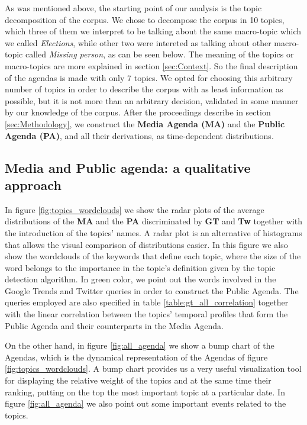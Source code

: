 
\par As was mentioned above, the starting point of our analysis is the topic decomposition of the corpus.
We chose to decompose the corpus in 10 topics, which three of them we interpret to be talking about the same macro-topic which we called \emph{Elections}, while other two were intereted as talking about other macro-topic called \emph{Missing person}, as can be seen below. 
The meaning of the topics or macro-topics are more explained in section \ref{sec:Context}. 
So the final description of the agendas is made with only 7 topics.
We opted for choosing this arbitrary number of topics in order to describe the corpus with as least information as possible, but it is not more than an arbitrary decision, validated in some manner by our knowledge of the corpus.
After the proceedings describe in section \ref{sec:Methodology}, we construct the \textbf{Media Agenda (MA)} and the \textbf{Public Agenda (PA)}, and all their derivations, as time-dependent distributions. 

\subsection{Media and Public agenda: a qualitative approach}

\par In figure \ref{fig:topics_wordclouds} we show the radar plots of the average distributions of the \textbf{MA} and the \textbf{PA} discriminated by \textbf{GT} and \textbf{Tw} together with the introduction of the topics' names.
A radar plot is an alternative of histograms that allows the visual comparison of distributions easier.
In this figure we also show the wordclouds of the keywords that define each topic, where the size of the word belongs to the importance in the topic's definition given by the topic detection algorithm. In green color, we point out the words involved in the Google Trends and Twitter queries in order to construct the Public Agenda. The queries employed are also specified in table \ref{table:gt_all_correlation} together with the linear correlation between the topics' temporal profiles that form the Public Agenda and their counterparts in the Media Agenda.

\par On the other hand, in figure \ref{fig:all_agenda} we show a bump chart of the Agendas, which is the dynamical representation of the Agendas of figure \ref{fig:topics_wordclouds}. 
A bump chart provides us a very useful visualization tool for displaying the relative weight of the topics and at the same time their ranking, putting on the top the most important topic at a particular date.
In figure \ref{fig:all_agenda} we also point out some important events related to the topics.

